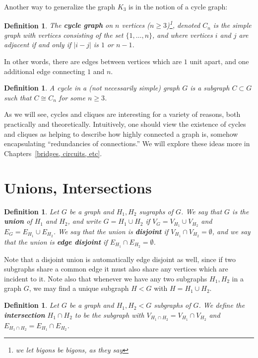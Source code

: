 \documentclass[12pt]{report}
\theoremstyle{plain}
\newtheorem{defn}[thm]{Definition}
\newcommand{\Xb}[1]{\textbf{#1}\index{#1}}
\begin{document}
Another way to generalize the graph $K_3$ is in the notion of a cycle graph:
\begin{defn}
The \Xb{cycle graph} on $n$ vertices ($n \geq 3$)\footnote{we let bigons be
bigons, as they say}, denoted $C_n$ is the simple graph with vertices
consisting of the set $\{1, \ldots, n\}$, and where vertices $i$ and $j$
are adjacent if and only if $|i - j|$ is $1$ or $n-1$.
\end{defn}
In other words, there are edges between vertices which are $1$ unit apart,
and one additional edge connecting $1$ and $n$.

\begin{defn}
A cycle in a (not necessarily simple) graph $G$ is a subgraph $C \subset G$
such that $C \cong C_n$ for some $n \geq 3$.
\end{defn}

As we will see, cycles and cliques are interesting for a variety of
reasons, both practically and theoretically. Intuitively,
one should view the existence of cycles and cliques as helping to describe
how highly connected a graph is, somehow encapsulating ``redundancies of
connections.'' We will explore these ideas more in Chapters~\ref{bridges,
circuits, etc}.

\section{Unions, Intersections}

\begin{defn}
Let $G$ be a graph and $H_1, H_2$ sugraphs of $G$. We say that $G$ is the
\textbf{union} of $H_1$ and $H_2$, and write $G = H_1
\cup H_2$ if $V_G = V_{H_1} \cup V_{H_2}$ and $E_G = E_{H_1} \cup
E_{H_2}$. We say that the union is \textbf{disjoint}
if $V_{H_1} \cap V_{H_2} = \emptyset$, and we say that the union is
\textbf{edge disjoint} if $E_{H_1} \cap
E_{H_2} = \emptyset$.
\end{defn}
Note that a disjoint union is automatically edge disjoint as well, since if
two subgraphs share a common edge it must also share any vertices which are
incident to it. Note also that whenever we have any two subgraphs $H_1,
H_2$ in a graph $G$, we may find a unique subgraph $H < G$ with $H = H_1
\cup H_2$. 

\begin{defn} \label{intersection definition}
Let $G$ be a graph and $H_1, H_2 < G$ subgraphs of $G$. We define the
\textbf{intersection} $H_1 \cap
H_2$ to be the subgraph with $V_{H_1 \cap H_2} = V_{H_1} \cap V_{H_2}$ and
$E_{H_1 \cap H_2} = E_{H_1} \cap E_{H_2}$. 
\end{defn}
\end{document}
